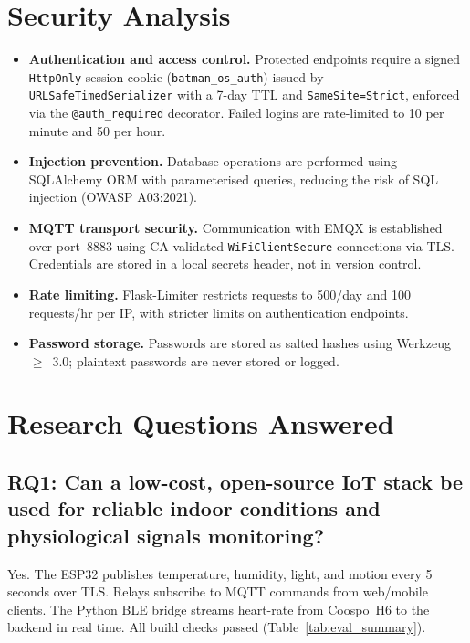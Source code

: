 \section{Security Analysis}
\label{sec:security}

\begin{itemize}

\item \textbf{Authentication and access control.} Protected endpoints require a
  signed \texttt{HttpOnly} session cookie (\texttt{batman\_os\_auth}) issued by
  \texttt{URLSafeTimedSerializer} with a 7-day TTL and \texttt{SameSite=Strict},
  enforced via the \texttt{@auth\_required} decorator.
  Failed logins are rate-limited to 10 per minute and 50 per hour.

\item \textbf{Injection prevention.} Database operations are performed using SQLAlchemy ORM with parameterised queries, reducing the risk of SQL injection (OWASP A03:2021).

\item \textbf{MQTT transport security.} Communication with EMQX is established over port~8883 using CA-validated \texttt{WiFiClientSecure} connections via TLS. Credentials are stored in a local secrets header, not in version control.

\item \textbf{Rate limiting.} Flask-Limiter restricts requests to 500/day and 100 requests/hr per IP, with stricter limits on authentication endpoints.

\item \textbf{Password storage.} Passwords are stored as salted hashes using Werkzeug~$\geq$~3.0; plaintext passwords are never stored or logged.

\end{itemize}
\section{Research Questions Answered}
\label{sec:rq_answers}

\subsection*{RQ1: Can a low-cost, open-source IoT stack be used for reliable indoor conditions and physiological signals monitoring?}

Yes. The ESP32 publishes temperature, humidity, light, and motion every 5 seconds over TLS. Relays subscribe to MQTT commands from web/mobile clients. The Python BLE bridge streams heart-rate from Coospo~H6 to the backend in real time. All build checks passed (Table~\ref{tab:eval_summary}).

